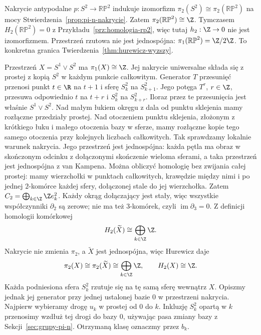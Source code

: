 \begin{przyklad}
\label{prz:rp2-pi2}
Nakrycie antypodalne
$p:S^2\to\mathbb{RP}^2$
indukuje izomorfizm
$\pi_2(S^2)\cong
\pi_2(\mathbb{RP}^2)$
na mocy
Stwierdzenia~\ref{prop:pi-n-nakrycie}.
Zatem
$\pi_2(\mathbb{RP}^2)\cong\Z$.
Tymczasem
$H_2(\mathbb{RP}^2)=0$
z Przykładu~\ref{prz:homologia-rp2},
więc tutaj
$h_2:\Z\to0$
nie jest izomorfizmem.
Przestrzeń rzutowa
nie jest jednospójna:
$\pi_1(\mathbb{RP}^2)=\Z/2\Z$.
To konkretna granica
Twierdzenia~\ref{thm:hurewicz-wyzszy}.
\end{przyklad}

\begin{przyklad}
\label{prz:pi-bukiet-pokrycie}
Przestrzeń
$X=S^1\vee S^2$
ma $\pi_1(X)\cong\Z$.
Jej nakrycie uniwersalne
składa się z prostej
z kopią $S^2$ w każdym
punkcie całkowitym.
Generator $T$ przesunięć przenosi punkt $t\in\R$ na $t+1$
i sferę $S_k^2$ na $S_{k+1}^2$. Jego potęga $T^r$, $r\in\Z$,
przesuwa odpowiednio $t$ na $t+r$ i $S_k^2$ na $S_{k+r}^2$.
Iloraz przez te przesunięcia jest właśnie $S^1\vee S^2$.
Nad małym łukiem okręgu z dala od punktu sklejenia mamy
rozłączne przedziały prostej. Nad otoczeniem punktu sklejenia,
złożonym z krótkiego łuku i małego otoczenia bazy w sferze,
mamy rozłączne kopie tego samego otoczenia przy kolejnych liczbach
całkowitych. Tak sprawdzamy lokalnie warunek nakrycia.
Jego przestrzeń jest jednospójna: każda pętla ma obraz
w skończonym odcinku z dołączonymi skończenie wieloma sferami,
a taka przestrzeń jest jednospójna z van Kampena.
Można obliczyć homologię bez zwijania całej prostej:
mamy wierzchołki w punktach całkowitych, krawędzie między nimi
i po jednej $2$-komórce każdej sfery, dołączonej stale do jej wierzchołka.
Zatem $C_2=\bigoplus_{k\in\Z}\Z e_k^2$.
Każdy okrąg dołączający jest stały, więc wszystkie współczynniki
$\partial_2$ są zerowe; nie ma też $3$-komórek, czyli
$\operatorname{im}\partial_3=0$.
Z definicji homologii komórkowej
\[
 H_2(\widetilde X)
 \cong\bigoplus_{k\in\Z}\Z.
\]
Nakrycie nie zmienia
$\pi_2$, a
$\widetilde X$
jest jednospójna,
więc Hurewicz daje
\[
 \pi_2(X)\cong
 \pi_2(\widetilde X)
 \cong\bigoplus_{k\in\Z}\Z,
 \qquad
 H_2(X)\cong\Z.
\]
Każda podniesiona
sfera $S_k^2$
rzutuje się
na tę samą sferę
wewnątrz $X$.
Opiszmy jednak jej generator przy jednej ustalonej bazie $0$
w przestrzeni nakrycia. Najpierw wybieramy drogę $u_k$ w prostej
od $0$ do $k$. Inkluzję $S_k^2$ opartą w $k$ przenosimy
wzdłuż tej drogi do bazy $0$, używając pasa zmiany bazy
z Sekcji~\ref{sec:grupy-pi-n}. Otrzymaną klasę oznaczmy przez $b_k$.

\end{przyklad}
